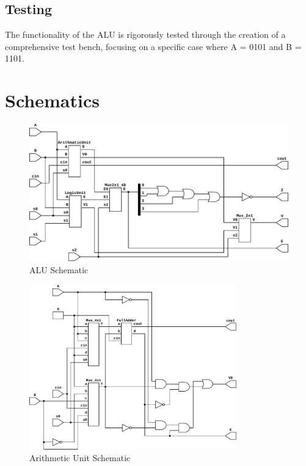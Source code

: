 \documentclass{article}
\begin{document}
\newpage

\subsection{Testing}

The functionality of the ALU is rigorously tested through the creation of a
comprehensive test bench, focusing on a specific case where A = 0101 and B =
1101.



\section{Schematics}

\begin{figure}[H]
  \begin{center}
    \includegraphics[width=\textwidth]{figures/ALU.pdf}
  \end{center}
  \caption{ALU Schematic}
\end{figure}

\begin{figure}[H]
  \begin{center}
    \includegraphics[width=0.8\textwidth]{figures/ArithmaticUnit-1bit.pdf}
  \end{center}
  \caption{Arithmetic Unit Schematic}
\end{figure}
\end{document}
